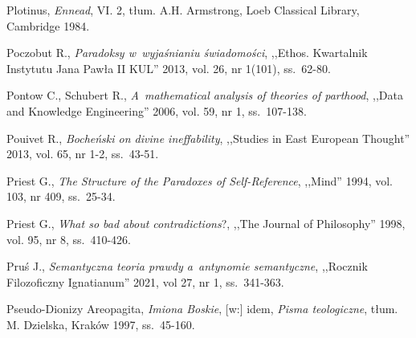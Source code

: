 \begin{thebibliography}{100}
Plotinus, \textit{Ennead}, VI. 2, tłum. A.H. Armstrong, Loeb Classical Library, Cambridge 1984.


Poczobut R., \textit{Paradoksy w~wyjaśnianiu świadomości}, ,,Ethos. Kwartalnik Instytutu Jana Pawła II KUL'' 2013, vol. 26, nr 1(101), ss.~62-80.

Pontow C., Schubert R., \textit{A~mathematical analysis of theories of parthood}, ,,Data and Knowledge Engineering'' 2006, vol. 59, nr 1, ss.~107-138.


Pouivet R., \textit{Bocheński on divine ineffability}, ,,Studies in East European Thought'' 2013, vol. 65, nr 1-2, ss.~43-51.


Priest G., \textit{The Structure of the Paradoxes of Self-Reference}, ,,Mind'' 1994, vol. 103, nr 409, ss.~25-34.

Priest G., \textit{What so bad about contradictions}?, ,,The Journal of Philosophy'' 1998, vol. 95, nr 8, ss.~410-426.

Pruś J., \textit{Semantyczna teoria prawdy a~antynomie semantyczne}, ,,Rocznik Filozoficzny Ignatianum'' 2021, vol 27, nr 1, ss.~341-363.

%


Pseudo-Dionizy Areopagita, \textit{Imiona Boskie}, [w:] idem, \textit{Pisma teologiczne}, tłum. M. Dzielska, Kraków 1997, ss.~45-160.


\end{thebibliography}
